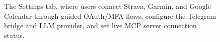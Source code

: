 \begin{figure}[ht]
\centering
{}
\caption[Settings tab]{The Settings tab, where users connect Strava, Garmin, and Google Calendar through guided OAuth/MFA flows, configure the Telegram bridge and LLM provider, and see live MCP server connection status.}\label{fig:screenshot_settings}
\end{figure}

